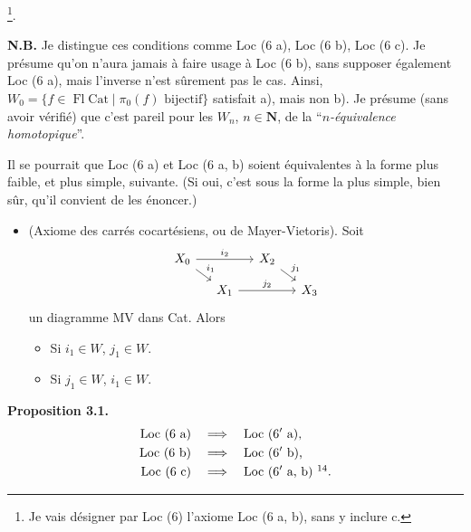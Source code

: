 \documentclass[11pt]{article}
\newcommand{\printedpage}[1]{\marginpar{\footnotesize p.~#1}}
\newcommand{\msp}[1]{\marginpar{\footnotesize [#1]}}
\newcommand{\Cat}{\mathrm{Cat}}
\newcommand{\Fl}{\operatorname{Fl}}
\begin{document}
\printedpage{13}
\msp{17$'$}
\noindent\footnote[13]{Je vais désigner par Loc (6) l'axiome Loc (6 a, b), sans y inclure c.}.

\textbf{N.B.} Je distingue ces conditions comme Loc (6 a), Loc (6 b), Loc (6 c). Je présume qu'on n'aura jamais à faire usage à Loc (6 b), sans supposer également Loc (6 a), mais l'inverse n'est sûrement pas le cas. Ainsi, $W_0=\{f\in\Fl\Cat\mid\pi_0(f)\text{ bijectif}\}$ satisfait a), mais non b). Je présume (sans avoir vérifié) que c'est pareil pour les $W_n$, $n\in\mathbf{N}$, de la “\textit{$n$-équivalence homotopique}”.

Il se pourrait que Loc (6 a) et Loc (6 a, b) soient équivalentes à la forme plus faible, et plus simple, suivante. (Si oui, c'est sous la forme la plus simple, bien sûr, qu'il convient de les énoncer.)

\begin{itemize}[leftmargin=5em,labelwidth=4em,align=left]
\item[\textbf{Loc 6$'$}] (Axiome des carrés cocartésiens, ou de Mayer-Vietoris). Soit
\[
\begin{tikzcd}[row sep=small,column sep=small]
X_0 \arrow[rr,"i_2"] \arrow[dr,"i_1"] & & X_2 \arrow[dr,"j_1"] & \\
& X_1 \arrow[rr,"j_2"] & & X_3
\end{tikzcd}
\]
un diagramme MV dans Cat. Alors
\begin{itemize}[leftmargin=3em,labelwidth=2.5em,align=right]
\item[a)] Si $i_1\in W$, $j_1\in W$.
\item[b)] Si $j_1\in W$, $i_1\in W$.
\end{itemize}
\end{itemize}

\msp{18$'$}
\textbf{Proposition 3.1.}
\[
\begin{aligned}
\text{Loc (6 a)}\quad &\Longrightarrow\quad \text{Loc (6$'$ a),}\\
\text{Loc (6 b)}\quad &\Longrightarrow\quad \text{Loc (6$'$ b),}\\
\text{Loc (6 c)}\quad &\Longrightarrow\quad \text{Loc (6$'$ a, b)}\ \footnotemark[14].
\end{aligned}
\]
\end{document}
